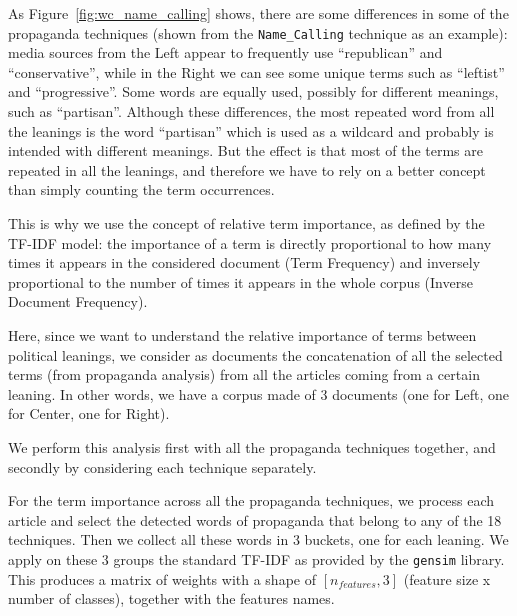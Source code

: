 
As Figure~\ref{fig:wc_name_calling} shows, there are some differences in some of the propaganda techniques (shown from the \texttt{Name\_Calling} technique as an example):
media sources from the Left appear to frequently use ``republican'' and ``conservative'', while in the Right we can see some unique terms such as ``leftist'' and ``progressive''. Some words are equally used, possibly for different meanings, such as ``partisan''.  
Although these differences, the most repeated word from all the leanings is the word ``partisan'' which is used as a wildcard and probably is intended with different meanings.
But the effect is that most of the terms are repeated in all the leanings, and therefore we have to rely on a better concept than simply counting the term occurrences.

This is why we use the concept of relative term importance, %
as defined by the TF-IDF model: the importance of a term is directly proportional to how many times it appears in the considered document (Term Frequency) and inversely proportional to the number of times it appears in the whole corpus (Inverse Document Frequency).

Here, since we want to understand the relative importance of terms between political leanings, we consider as documents the concatenation of all the selected terms (from propaganda analysis) from all the articles coming from a certain leaning. In other words, we have a corpus made of 3 documents (one for Left, one for Center, one for Right).

We perform this analysis first with all the propaganda techniques together, and secondly by considering each technique separately.

For the term importance across all the propaganda techniques, we process each article and select the detected words of propaganda that belong to any of the 18 techniques. Then we collect all these words in 3 buckets, one for each leaning.
We apply on these 3 groups the standard TF-IDF as provided by the \texttt{gensim} library. %
This produces a matrix of weights with a shape of $[n_{features}, 3]$ (feature size x number of classes), together with the features names.


